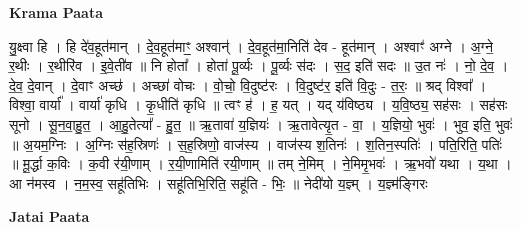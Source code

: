 \documentclass[17pt]{extarticle}
\begin{document}
\textbf{Krama Paata} \newline

यु॒क्ष्वा हि । हि दे॑व॒हूत॑मान् । दे॒व॒हूत॑माꣳ॒॒ अश्वान्॑ । दे॒व॒हूत॑मा॒निति॑ देव - हूत॑मान् । अश्वाꣳ॑ अग्ने । अ॒ग्ने॒ र॒थीः । र॒थीरि॑व । इ॒वे॒ती॑व ॥ नि होता᳚ । होता॑ पू॒र्व्यः । पू॒र्व्यः स॑दः । स॒द॒ इति॑ सदः ॥ उ॒त नः॑ । नो॒ दे॒व॒ । दे॒व॒ दे॒वान् । दे॒वाꣳ अच्छ॑ । अच्छा॑ वोचः । वो॒चो॒ वि॒दुष्ट॑रः । वि॒दुष्ट॑र॒ इति॑ वि॒दुः - त॒रः॒ ॥ श्रद् विश्वा᳚ । विश्वा॒ वार्या᳚ । वार्या॑ कृधि । कृ॒धीति॑ कृधि ॥ त्वꣳ ह॑ । ह॒ यत् । यद् य॑विष्ठ्य । य॒वि॒ष्ठ्य॒ सह॑सः । सह॑सः सूनो । सू॒न॒वा॒हु॒त॒ । आ॒हु॒तेत्या᳚ - हु॒त॒ ॥ ऋ॒तावा॑ य॒ज्ञियः॑ । ऋ॒तावेत्यृ॒त - वा॒ । य॒ज्ञियो॒ भुवः॑ । भुव॒ इति॒ भुवः॑ ॥ अ॒यम॒ग्निः । अ॒ग्निः स॑ह॒स्रिणः॑ । स॒ह॒स्रिणो॒ वाज॑स्य । वाज॑स्य श॒तिनः॑ । श॒तिन॒स्पतिः॑ । पति॒रिति॒ पतिः॑ ॥ मू॒र्द्धा क॒विः । क॒वी र॑यी॒णाम् । र॒यी॒णामिति॑ रयी॒णाम् ॥ तम् ने॒मिम् । ने॒मिमृ॒भवः॑ । ऋ॒भवो॑ यथा । य॒था । आ न॑मस्व । न॒म॒स्व॒ सहू॑तिभिः । सहू॑तिभि॒रिति॒ सहू॑ति - भिः॒ ॥ नेदी॑यो य॒ज्ञ्म् । य॒ज्ञ्म॑ङ्गिरः \newline

\textbf{Jatai Paata} \newline
\end{document}
